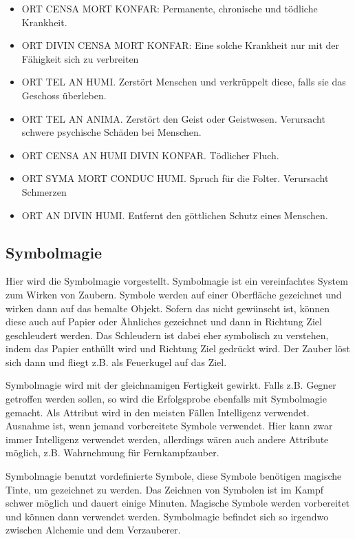 \documentclass{article}
\begin{document}
\begin{itemize}
\item ORT CENSA MORT KONFAR: Permanente, chronische und tödliche Krankheit.
\item ORT DIVIN CENSA MORT KONFAR: Eine solche Krankheit nur mit der Fähigkeit sich zu verbreiten
\item ORT TEL AN HUMI. Zerstört Menschen und verkrüppelt diese, falls sie das Geschoss überleben.
\item ORT TEL AN ANIMA. Zerstört den Geist oder Geistwesen. Verursacht schwere psychische Schäden bei Menschen.
\item ORT CENSA AN HUMI DIVIN KONFAR. Tödlicher Fluch.
\item ORT SYMA MORT CONDUC HUMI. Spruch für die Folter. Verursacht Schmerzen
\item ORT AN DIVIN HUMI. Entfernt den göttlichen Schutz eines Menschen.
\end{itemize}

\begin{center}
\section{Symbolmagie}
\end{center}

Hier wird die Symbolmagie vorgestellt. Symbolmagie ist ein vereinfachtes System zum Wirken von Zaubern. Symbole
werden auf einer Oberfläche gezeichnet und wirken dann auf das bemalte Objekt.
Sofern das nicht gewünscht ist, können diese auch auf Papier oder Ähnliches gezeichnet und dann in Richtung Ziel
geschleudert werden. Das Schleudern ist dabei eher symbolisch zu verstehen, indem das Papier enthüllt wird und
Richtung Ziel gedrückt wird. Der Zauber löst sich dann und fliegt z.B. als Feuerkugel auf das Ziel.

Symbolmagie wird mit der gleichnamigen Fertigkeit gewirkt. Falls z.B. Gegner getroffen werden sollen, so wird die
Erfolgsprobe ebenfalls mit Symbolmagie gemacht. Als Attribut wird in den meisten Fällen Intelligenz verwendet.
Ausnahme ist, wenn jemand vorbereitete Symbole verwendet. Hier kann zwar immer Intelligenz verwendet werden,
allerdings wären auch andere Attribute möglich, z.B. Wahrnehmung für Fernkampfzauber.

Symbolmagie benutzt vordefinierte Symbole, diese Symbole benötigen magische Tinte, um gezeichnet zu werden. Das
Zeichnen von Symbolen ist im Kampf schwer möglich und dauert einige Minuten. Magische Symbole werden vorbereitet
und können dann verwendet werden. Symbolmagie befindet sich so irgendwo zwischen Alchemie und dem Verzauberer.
\end{document}

